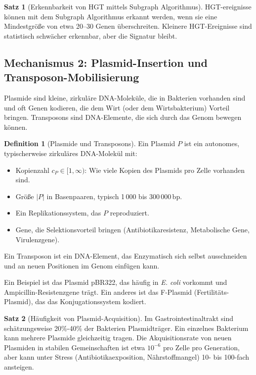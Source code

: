 \documentclass[a4paper,12pt]{article}
\theoremstyle{definition}
\newtheorem{definition}{Definition}
\newtheorem{satz}{Satz}
\begin{document}
\begin{satz}[Erkennbarkeit von HGT mittels Subgraph Algorithmus]
HGT-ereignisse können mit dem Subgraph Algorithmus erkannt werden, wenn sie eine Mindestgröße von etwa 20--30 Genen überschreiten. Kleinere HGT-Ereignisse sind statistisch schwächer erkennbar, aber die Signatur bleibt.
\end{satz}

\subsection{Mechanismus 2: Plasmid-Insertion und Transposon-Mobilisierung}

Plasmide sind kleine, zirkuläre DNA-Moleküle, die in Bakterien vorhanden sind und oft Genen kodieren, die dem Wirt (oder dem Wirtsbakterium) Vorteil bringen. Transposons sind DNA-Elemente, die sich durch das Genom bewegen können.

\begin{definition}[Plasmide und Transposons]
Ein Plasmid $P$ ist ein autonomes, typischerweise zirkuläres DNA-Molekül mit:
\begin{itemize}
    \item[-] Kopienzahl $c_P \in [1, \infty)$: Wie viele Kopien des Plasmids pro Zelle vorhanden sind.
    \item[-] Größe $|P|$ in Basenpaaren, typisch 1\,000 bis 300\,000\,bp.
    \item[-] Ein Replikationssystem, das $P$ reproduziert.
    \item[-] Gene, die Selektionsvorteil bringen (Antibiotikaresistenz, Metabolische Gene, Virulenzgene).
\end{itemize}

Ein Transposon ist ein DNA-Element, das Enzymatisch sich selbst ausschneiden und an neuen Positionen im Genom einfügen kann.
\end{definition}

Ein Beispiel ist das Plasmid pBR322, das häufig in \textit{E. coli} vorkommt und Ampicillin-Resistenzgene trägt. Ein anderes ist das F-Plasmid (Fertilitäts-Plasmid), das das Konjugationssystem kodiert.

\begin{satz}[Häufigkeit von Plasmid-Acquisition]
Im Gastrointestinaltrakt sind schätzungsweise 20\%-40\% der Bakterien Plasmidträger. Ein einzelnes Bakterium kann mehrere Plasmide gleichzeitig tragen. Die Akquisitionsrate von neuen Plasmiden in stabilen Gemeinschaften ist etwa $10^{-6}$ pro Zelle pro Generation, aber kann unter Stress (Antibiotikaexposition, Nährstoffmangel) 10- bis 100-fach ansteigen.
\end{satz}
\end{document}
